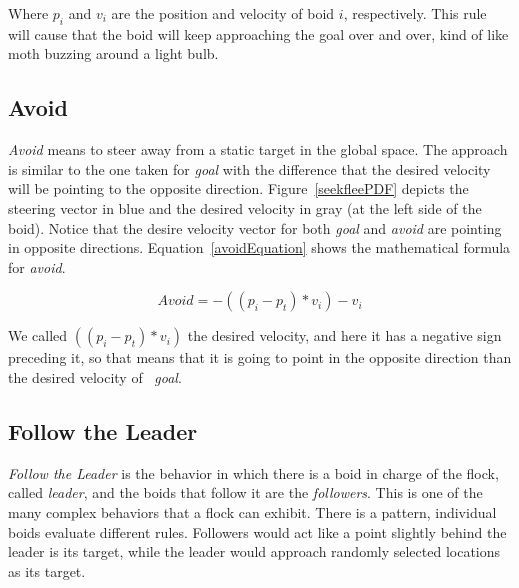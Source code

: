 Where $p_i$ and $v_i$ are the position and velocity of boid $i$, respectively. This rule will cause that the boid will keep approaching the goal over and over, kind of like moth buzzing around a light bulb.

\subsection{Avoid}
\textit{Avoid} means to steer away from a static target in the global space. The approach is similar to the one taken for \textit{goal} with the difference that the desired velocity will be pointing to the opposite direction. Figure~\ref{seekfleePDF} depicts the steering vector in blue and the desired velocity in gray (at the left side of the boid). Notice that the desire velocity vector for both \textit{goal} and \textit{avoid} are pointing in opposite directions. Equation~\ref{avoidEquation} shows the mathematical formula for \textit{avoid}.

\begin{equation}
\label{avoidEquation}
Avoid = -((p_i - p_t) * v_i) - v_i
\end{equation}

We called $((p_i - p_t) * v_i)$ the desired velocity, and here it has a negative sign preceding it, so that means that it is going to point in the opposite direction than the desired velocity of ~\textit{goal}.

\subsection{Follow the Leader}
\textit{Follow the Leader} is the behavior in which there is a boid in charge of the flock, called \textit{leader}, and the boids that follow it are the \textit{followers}. This is one of the many complex behaviors that a flock can exhibit. There is a pattern, individual boids evaluate different rules. Followers would act like a point slightly behind the leader is its target, while the leader would approach randomly selected locations as its target.

